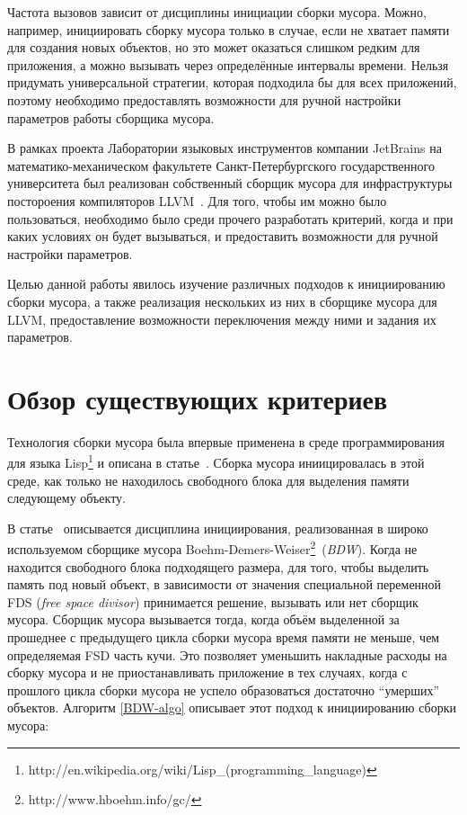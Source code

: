 Частота вызовов
зависит от дисциплины инициации сборки мусора. Можно, например, инициировать сборку
мусора только в случае, если не хватает памяти для создания новых объектов, но это может 
оказаться слишком редким для приложения, а можно вызывать через определённые интервалы времени.
Нельзя придумать универсальной стратегии, которая подходила бы для всех приложений, поэтому
необходимо
предоставлять возможности для ручной настройки параметров работы сборщика мусора. 

В рамках проекта Лаборатории языковых инструментов компании JetBrains на математико-механическом 
факультете
Санкт-Петербургского государственного университета был реализован собственный сборщик
мусора для
инфраструктуры постороения компиляторов LLVM~\cite{llvm-text}. Для того, чтобы им можно
было пользоваться,
необходимо было среди прочего разработать критерий, когда и при каких условиях он будет 
вызываться, и предоставить возможности для ручной настройки параметров.

Целью данной работы явилось изучение различных подходов к инициированию сборки мусора,
а также реализация нескольких из них в сборщике мусора для LLVM, предоставление 
возможности переключения между ними и задания их параметров.

\section {Обзор существующих критериев}

Технология сборки мусора была впервые применена в среде программирования для языка
Lisp\footnote{http://en.wikipedia.org/wiki/Lisp\_(programming\_language)} и описана 
в статье~\cite{Lisp}. Сборка мусора иниицировалась в этой среде, как только не находилось
свободного блока для выделения памяти следующему объекту. 



В статье~\cite{BDW} описывается дисциплина инициирования, реализованная в
широко используемом сборщике мусора
Boehm-Demers-Weiser\footnote{http://www.hboehm.info/gc/}~(\emph{BDW}). 
Когда не находится свободного блока подходящего размера, для того, чтобы выделить память 
под новый объект,
в зависимости от значения специальной переменной FDS (\emph{free space divisor}) 
принимается решение,
вызывать или нет сборщик мусора. Сборщик мусора вызывается тогда, когда объём выделенной за прошеднее с предыдущего цикла сборки мусора
время памяти не меньше, чем определяемая FSD часть кучи. Это позволяет  уменьшить накладные расходы на сборку мусора и не приостанавливать
приложение в тех случаях, когда с прошлого цикла сборки мусора не успело образоваться
достаточно ``умерших'' объектов. Алгоритм \ref{BDW-algo} описывает этот подход к инициированию сборки мусора: 

